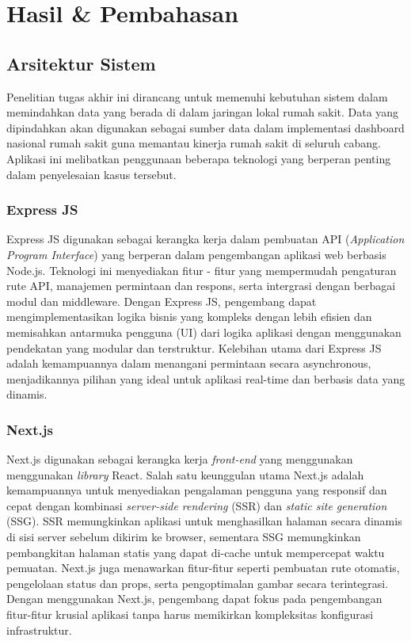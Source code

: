 \section{Hasil \& Pembahasan}
\label{sec:hasil}


\subsection{Arsitektur Sistem}
Penelitian tugas akhir ini dirancang untuk memenuhi kebutuhan sistem dalam memindahkan data yang berada di dalam jaringan lokal rumah sakit. Data yang dipindahkan akan digunakan sebagai sumber data dalam implementasi dashboard nasional rumah sakit guna memantau kinerja rumah sakit di seluruh cabang. Aplikasi ini melibatkan penggunaan beberapa teknologi yang berperan penting dalam penyelesaian kasus tersebut.
  \subsubsection{Express JS} 
  Express JS digunakan sebagai kerangka kerja dalam pembuatan API (\emph{Application Program Interface}) yang berperan dalam pengembangan aplikasi web berbasis Node.js. Teknologi ini menyediakan fitur - fitur yang mempermudah pengaturan rute API, manajemen permintaan dan respons, serta intergrasi dengan berbagai modul dan middleware. Dengan Express JS, pengembang dapat mengimplementasikan logika bisnis yang kompleks dengan lebih efisien dan memisahkan antarmuka pengguna (UI) dari logika aplikasi dengan menggunakan pendekatan yang modular dan terstruktur. Kelebihan utama dari Express JS adalah kemampuannya dalam menangani permintaan secara asynchronous, menjadikannya pilihan yang ideal untuk aplikasi real-time dan berbasis data yang dinamis.

  \subsubsection{Next.js}
  Next.js digunakan sebagai kerangka kerja \emph{front-end} yang menggunakan menggunakan \emph{library} React. Salah satu keunggulan utama Next.js adalah kemampuannya untuk menyediakan pengalaman pengguna yang responsif dan cepat dengan kombinasi \emph{server-side rendering} (SSR) dan \emph{static site generation} (SSG). SSR memungkinkan aplikasi untuk menghasilkan halaman secara dinamis di sisi server sebelum dikirim ke browser, sementara SSG memungkinkan pembangkitan halaman statis yang dapat di-cache untuk mempercepat waktu pemuatan. Next.js juga menawarkan fitur-fitur seperti pembuatan rute otomatis, pengelolaan status dan props, serta pengoptimalan gambar secara terintegrasi. Dengan menggunakan Next.js, pengembang dapat fokus pada pengembangan fitur-fitur krusial aplikasi tanpa harus memikirkan kompleksitas konfigurasi infrastruktur.

